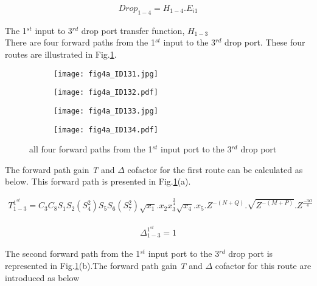 \documentclass{osa-article}
\begin{document}
\begin{equation}
\begin{split}
Drop_{1-4}=H_{1-4}.E_{i1}
\end{split}
\end{equation}

The 1$^{st}$ input to 3$^{rd}$ drop port transfer function, $H_{1-3}$\\

There are four forward paths from the 1$^{st}$ input to the 3$^{rd}$ drop port.  These four routes are illustrated in Fig.\ref{fig4a}.
\begin{figure}[h!]
  \centering
  \begin{subfigure}[b]{0.4\linewidth}
    \texttt{[image: fig4a\_ID131.jpg]}
    \caption{}
  \end{subfigure}
  \begin{subfigure}[b]{0.4\linewidth}
    \texttt{[image: fig4a\_ID132.pdf]}
    \caption{}
  \end{subfigure}
  \begin{subfigure}[b]{0.4\linewidth}
    \texttt{[image: fig4a\_ID133.jpg]}
    \caption{}
  \end{subfigure}
  \begin{subfigure}[b]{0.4\linewidth}
    \texttt{[image: fig4a\_ID134.pdf]}
    \caption{}
  \end{subfigure}
  \caption{all four forward paths from the 1$^{st}$ input port to the 3$^{rd}$ drop port}
  \label{fig4a}
\end{figure}
The forward path gain \textit {T} and $\Delta$ cofactor for the first route can be calculated as below. This forward path is presented in Fig.\ref{fig4a}(a).

\begin{equation}
\begin{split}
T^{1^{st}}_{1-3}=C_3C_8S_1S_2(S^2_4)S_5S_6(S^2_7)\sqrt{x_1}.x_{2}{x^{\frac{3}{4}}_3}\sqrt{x_4}.x_{5}.Z^{-(N+Q)}.\sqrt{Z^{-(M+P)}}.Z^{\frac{-3O}{4}}
\end{split}
\end{equation}

\begin{equation}
\begin{split}
\Delta^{1^{st}}_{1-3}=1
\end{split}
\end{equation}

The second forward path from the 1$^{st}$ input port to the 3$^{rd}$ drop port is represented in Fig.\ref{fig4a}(b).The forward path gain \textit {T} and $\Delta$ cofactor for this route are introduced as below
\end{document}
